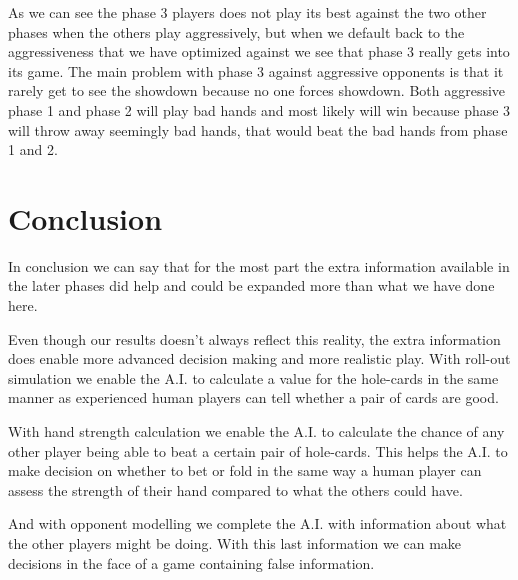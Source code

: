 \documentclass[titlepage, a4paper]{article}
\begin{document}
As we can see the phase 3 players does not play its best against the two other
phases when the others play aggressively, but when we default back to the aggressiveness
that we have optimized against we see that phase 3 really gets into its game. The main
problem with phase 3 against aggressive opponents is that it rarely get to
see the showdown because no one forces showdown. Both aggressive phase 1 and phase 2
will play bad hands and most likely will win because phase 3 will throw away
seemingly bad hands, that would beat the bad hands from phase 1 and 2.

\section{Conclusion}\label{conclusion}
In conclusion we can say that for the most part the extra information available
in the later phases did help and could be expanded more than what we have done
here.

Even though our results doesn't always reflect this reality, the extra information does
enable more advanced decision making and more realistic play. With roll-out simulation
we enable the A.I. to calculate a value for the hole-cards in the same manner as 
experienced human players can tell whether a pair of cards are good.

With hand strength calculation we enable the A.I. to calculate the chance of any
other player being able to beat a certain pair of hole-cards. This helps the A.I.
to make decision on whether to bet or fold in the same way a human player can assess
the strength of their hand compared to what the others could have.

And with opponent modelling we complete the A.I. with information about what
the other players might be doing. With this last information we can make decisions
in the face of a game containing false information.

\end{document}
